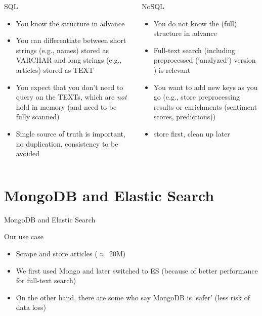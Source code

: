 \documentclass{beamer}
\begin{document}
\begin{frame}%
\small
\begin{columns}
\begin{block}{SQL}
	\begin{itemize}
		\item You know the structure in advance
		\item You can differentiate between short strings (e.g., names) stored as VARCHAR and long strings (e.g., articles) stored as TEXT %
		\item You expect that you don't need to query on the TEXTs, which are \emph{not} hold in memory (and need to be fully scanned)
		\item Single source of truth is important, no duplication, consistency to be avoided %
	\end{itemize}
\end{block}
\pause
{}
\begin{block}{NoSQL}
		\begin{itemize}
			\item You do not know the (full) structure in advance
			\item Full-text search (including  preprocessed (`analyzed') version ) is relevant
			\item You want to add new keys as you go (e.g., store preprocessing results or enrichments (sentiment scores, predictions))
			\item store first, clean up later
		\end{itemize}
\end{block}
\end{columns}


\end{frame}



\section{MongoDB and Elastic Search}


\begin{frame}[plain]
	MongoDB and Elastic Search
\end{frame}


\begin{frame}[<+->]{Our use case}
	\begin{itemize}
		\item Scrape and store articles ($\approx$ 20M)
		\item We first used Mongo and later switched to ES (because of better performance for full-text search)
		\item On the other hand, there are some who say MongoDB is `safer' (less risk of data loss)
	\end{itemize}
\end{frame}
\end{document}
